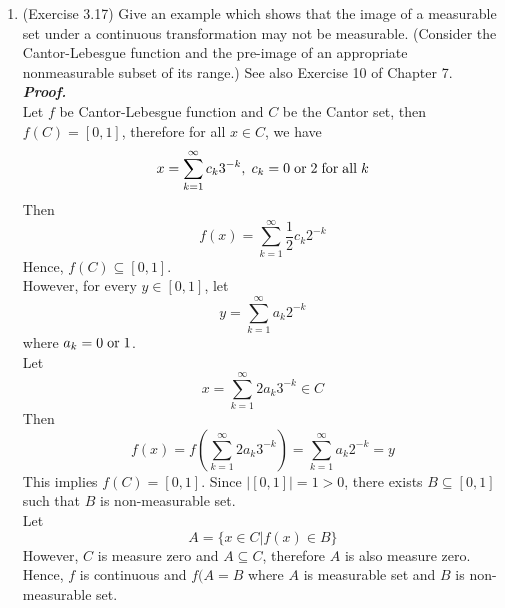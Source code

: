 \documentclass[a4paper,11pt]{article}
\begin{document}
\begin{enumerate}
\item (Exercise 3.17) Give an example which shows that the image of a measurable set under a continuous transformation may not be measurable. (Consider the Cantor-Lebesgue function and the pre-image of an appropriate nonmeasurable subset of its range.) See also Exercise 10 of Chapter 7.\\
\newline
\textit{\textbf {Proof.}}\\
Let $f$ be Cantor-Lebesgue function and $\mathit{C}$ be the Cantor set, then $f(C) = [0,1]$, therefore for all $x \in \mathit{C}$, we have
$$x = \sum_{k=1}^{\infty} c_k 3^{-k}, \hspace{0.1cm} c_k = 0 \hspace{0.1cm} \mathrm{or} \hspace{0.1cm} 2 \hspace{0.1cm} \mathrm{for} \hspace{0.1cm} \mathrm{all} \hspace{0.1cm}k$$
Then
$$f(x) = \sum_{k=1}^{\infty} \frac{1}{2} c_k 2^{-k}$$
Hence, $f(C) \subseteq [0,1]$.\\
However, for every $y \in [0,1]$, let
$$y = \sum_{k=1}^{\infty} a_k 2^{-k}$$
where $a_k = 0 \hspace{0.1cm} \mathrm{or} \hspace{0.1cm} 1$.\\
Let
$$x = \sum_{k=1}^{\infty} 2 a_k 3^{-k} \in \mathit{C}$$
Then
$$f(x) = f(\sum_{k=1}^{\infty} 2 a_k 3^{-k}) = \sum_{k=1}^{\infty} a_k 2^{-k} = y$$
This implies $f(\mathit{C}) = [0,1]$. Since $|[0,1]| = 1 > 0$, there exists $B \subseteq [0,1]$ such that $B$ is non-measurable set.\\
Let
$$A = \{ x \in \mathit{C} | f(x) \in B \}$$
However, $\mathit{C}$ is measure zero and $A \subseteq C$, therefore $A$ is also measure zero.\\
Hence, $f$ is continuous and $f(A = B$ where $A$ is measurable set and $B$ is non-measurable set.
\newline




\end{enumerate}
\end{document}
